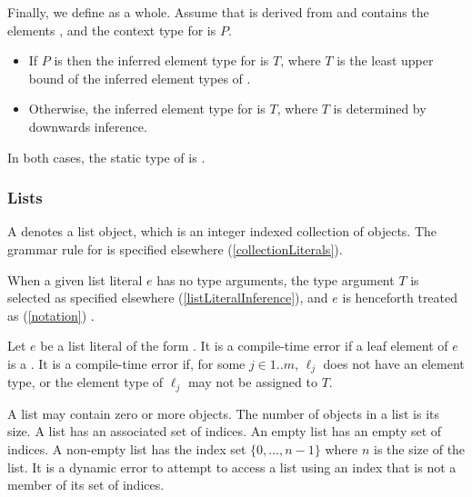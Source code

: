 \documentclass[makeidx]{article}
\begin{document}
{
\vspace{3mm}
\EndCase

\LMHash{}%
Finally, we define
as a whole.
Assume that  is derived from 
and contains the elements ,
and the context type for  is $P$.

\begin{itemize}
\item
  If $P$ is \FreeContext{} then
  the inferred element type for  is $T$,
  where $T$ is the least upper bound of
  the inferred element types of .

\item
  Otherwise,
  the inferred element type for  is $T$,
  where $T$ is determined by downwards inference.
\end{itemize}

\LMHash{}%
In both cases, the static type of  is .


\subsubsection{Lists}

\LMHash{}%
A 
denotes a list object, which is an integer indexed collection of objects.
The grammar rule for  is specified elsewhere
(\ref{collectionLiterals}).

\LMHash{}%
When a given list literal $e$ has no type arguments,
the type argument $T$ is selected as specified elsewhere
(\ref{listLiteralInference}),
and $e$ is henceforth treated as
(\ref{notation})
.


\LMHash{}%
Let $e$ be a list literal of the form
.
It is a compile-time error if a leaf element of $e$ is a
.
It is a compile-time error if, for some $j \in 1 .. m$,
$\ell_j$ does not have an element type,
or the element type of $\ell_j$ may not be assigned to $T$.

\LMHash{}%
A list may contain zero or more objects.
The number of objects in a list is its size.
A list has an associated set of indices.
An empty list has an empty set of indices.
A non-empty list has the index set $\{0, \ldots, n - 1\}$ where $n$ is the size of the list.
It is a dynamic error to attempt to access a list
using an index that is not a member of its set of indices.

}
\end{document}
